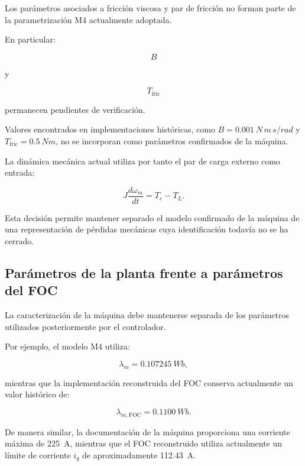 Los parámetros asociados a fricción viscosa y par de fricción no forman parte de la parametrización M4 actualmente adoptada.

En particular:

\begin{equation}
B
\end{equation}

y

\begin{equation}
T_{\mathrm{fric}}
\end{equation}

permanecen pendientes de verificación.

Valores encontrados en implementaciones históricas, como $B=\SI{0.001}{N\,m\,s/rad}$ y $T_{\mathrm{fric}}=\SI{0.5}{Nm}$, no se incorporan como parámetros confirmados de la máquina.

La dinámica mecánica actual utiliza por tanto el par de carga externo como entrada:

\begin{equation}
J\frac{d\omega_m}{dt}=T_e-T_L.
\end{equation}

Esta decisión permite mantener separado el modelo confirmado de la máquina de una representación de pérdidas mecánicas cuya identificación todavía no se ha cerrado.

\subsection{Parámetros de la planta frente a parámetros del FOC}

La caracterización de la máquina debe mantenerse separada de los parámetros utilizados posteriormente por el controlador.

Por ejemplo, el modelo M4 utiliza:

\begin{equation}
\lambda_m=\SI{0.107245}{Wb},
\end{equation}

mientras que la implementación reconstruida del FOC conserva actualmente un valor histórico de:

\begin{equation}
\lambda_{m,\mathrm{FOC}}=\SI{0.1100}{Wb}.
\end{equation}

De manera similar, la documentación de la máquina proporciona una corriente máxima de \SI{225}{A}, mientras que el FOC reconstruido utiliza actualmente un límite de corriente $i_q$ de aproximadamente \SI{112.43}{A}.

